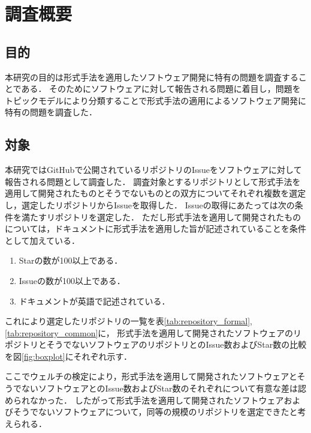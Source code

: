 \documentclass[main]{subfiles}
\begin{document}
\chapter{調査概要}

\section{目的}

本研究の目的は形式手法を適用したソフトウェア開発に特有の問題を調査することである．
そのためにソフトウェアに対して報告される問題に着目し，問題をトピックモデルにより分類することで形式手法の適用によるソフトウェア開発に特有の問題を調査した．


\section{対象}
\label{sec:survey-target}

本研究ではGitHubで公開されているリポジトリのIssueをソフトウェアに対して報告される問題として調査した．
調査対象とするリポジトリとして形式手法を適用して開発されたものとそうでないものとの双方についてそれぞれ複数を選定し，選定したリポジトリからIssueを取得した．
Issueの取得にあたっては次の条件を満たすリポジトリを選定した．
ただし形式手法を適用して開発されたものについては，ドキュメントに形式手法を適用した旨が記述されていることを条件として加えている．

\begin{enumerate}
	\item Starの数が100以上である．
	\item Issueの数が100以上である．
	\item ドキュメントが英語で記述されている．
\end{enumerate}

これにより選定したリポジトリの一覧を表\ref{tab:repository_formal}, \ref{tab:repository_common}に，
形式手法を適用して開発されたソフトウェアのリポジトリとそうでないソフトウェアのリポジトリとのIssue数およびStar数の比較を図\ref{fig:boxplot}にそれぞれ示す．

ここでウェルチの検定により，形式手法を適用して開発されたソフトウェアとそうでないソフトウェアとのIssue数およびStar数のそれぞれについて有意な差は認められなかった．
したがって形式手法を適用して開発されたソフトウェアおよびそうでないソフトウェアについて，同等の規模のリポジトリを選定できたと考えられる．


\end{document}
